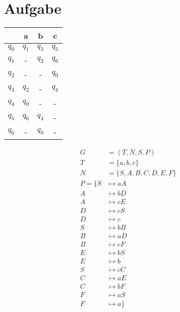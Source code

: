\documentclass[a4paper,10pt,headlines=3.2]{scrartcl}
\begin{document}
\section{Aufgabe}
\begin{center}
\begin{tabular}{c|c|c|c|}
\textbf{} & \textbf{a} & \textbf{b} & \textbf{c}\\\hline
\textbf{$q_0$} & $q_1$ & $q_3$ & $q_5$\\\hline
\textbf{$q_1$} & - & $q_2$ & $q_6$\\\hline
\textbf{$q_2$} & - & - & $q_0$\\\hline
\textbf{$q_3$} & $q_2$ & - & $q_4$\\\hline
\textbf{$q_4$} & $q_0$ & - & -\\\hline
\textbf{$q_5$} & $q_6$ & $q_4$ & -\\\hline
\textbf{$q_6$} & - & $q_0$ & -\\\hline
\end{tabular}
\end{center}

\begin{align}
G &= (T, N, S, P) \\
T &= \{a, b, c\} \\
N &= \{S, A, B, C, D, E, F\} \\
P = \{ S &\mapsto aA \\
A &\mapsto bD \\
A &\mapsto cE \\
D &\mapsto cS \\
D &\mapsto c \\
S &\mapsto bB \\
B &\mapsto aD \\
B &\mapsto cF \\
E &\mapsto bS \\
E &\mapsto b \\
S &\mapsto cC \\
C &\mapsto aE \\
C &\mapsto bF \\
F &\mapsto aS \\
F &\mapsto a \}
\end{align}
\end{document}

